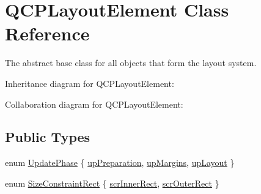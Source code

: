 \hypertarget{classQCPLayoutElement}{}\section{Q\+C\+P\+Layout\+Element Class Reference}
\label{classQCPLayoutElement}


The abstract base class for all objects that form the layout system.  




Inheritance diagram for Q\+C\+P\+Layout\+Element\+:


Collaboration diagram for Q\+C\+P\+Layout\+Element\+:
\subsection*{Public Types}
\begin{DoxyCompactItemize}
\item 
enum \hyperlink{classQCPLayoutElement_a0d83360e05735735aaf6d7983c56374d}{Update\+Phase} \{ \hyperlink{classQCPLayoutElement_a0d83360e05735735aaf6d7983c56374dad6119882eba136357c2f627992e527d3}{up\+Preparation}, 
\hyperlink{classQCPLayoutElement_a0d83360e05735735aaf6d7983c56374da288cb59a92280e47261a341f2813e676}{up\+Margins}, 
\hyperlink{classQCPLayoutElement_a0d83360e05735735aaf6d7983c56374da5d1ccf5d79967c232c3c511796860045}{up\+Layout}
 \}
\item 
enum \hyperlink{classQCPLayoutElement_a0afb3e5773529e4bd20e448f81be4d2a}{Size\+Constraint\+Rect} \{ \hyperlink{classQCPLayoutElement_a0afb3e5773529e4bd20e448f81be4d2aa7fa7e25cd23758b9915c64ed9f1be26c}{scr\+Inner\+Rect}, 
\hyperlink{classQCPLayoutElement_a0afb3e5773529e4bd20e448f81be4d2aabe2745b41a6131ed194e13591b08e04d}{scr\+Outer\+Rect}
 \}
\end{DoxyCompactItemize}
